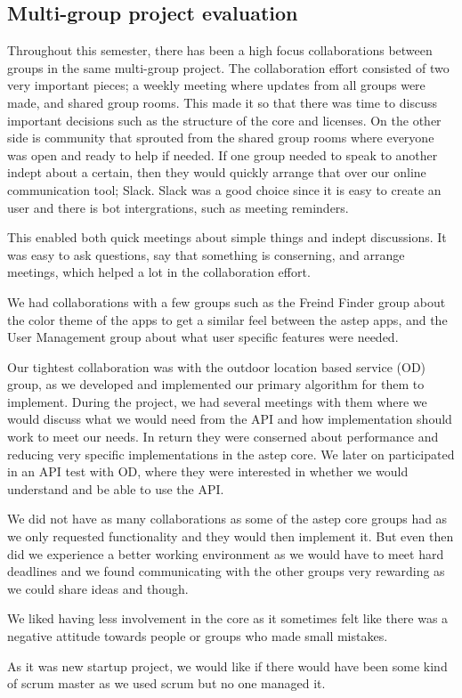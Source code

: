 \subsection{Multi-group project evaluation}
Throughout this semester, there has been a high focus collaborations between groups in the same multi-group project.
The collaboration effort consisted of two very important pieces; a weekly meeting where updates from all groups were made, and shared group rooms.
This made it so that there was time to discuss important decisions such as the structure of the core and licenses.
On the other side is community that sprouted from the shared group rooms where everyone was open and ready to help if needed.
If one group needed to speak to another indept about a certain, then they would quickly arrange that over our online communication tool; Slack.
Slack was a good choice since it is easy to create an user and there is bot intergrations, such as meeting reminders.

This enabled both quick meetings about simple things and indept discussions.
It was easy to ask questions, say that something is conserning, and arrange meetings, which helped a lot in the collaboration effort.

We had collaborations with a few groups such as the Freind Finder group about the color theme of the apps to get a similar feel between the \gls{astep} apps, and the User Management group about what user specific features were needed.

Our tightest collaboration was with the outdoor location based service (OD) group, as we developed and implemented our primary algorithm for them to implement.
During the project, we had several meetings with them where we would discuss what we would need from the API and how implementation should work to meet our needs.
In return they were conserned about performance and reducing very specific implementations in the \gls{astep} core.
We later on participated in an API test with OD, where they were interested in whether we would understand and be able to use the API.

We did not have as many collaborations as some of the \gls{astep} core groups had as we only requested functionality and they would then implement it.
But even then did we experience a better working environment as we would have to meet hard deadlines and we found communicating with the other groups very rewarding as we could share ideas and though.
 
We liked having less involvement in the core as it sometimes felt like there was a negative attitude towards people or groups who made small mistakes.

As it was new startup project, we would like if there would have been some kind of scrum master as we used scrum but no one managed it.